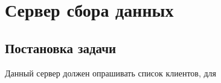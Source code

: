 \section{Сервер сбора данных}
\subsection{Постановка задачи}

Данный сервер должен опрашивать список клиентов, для 